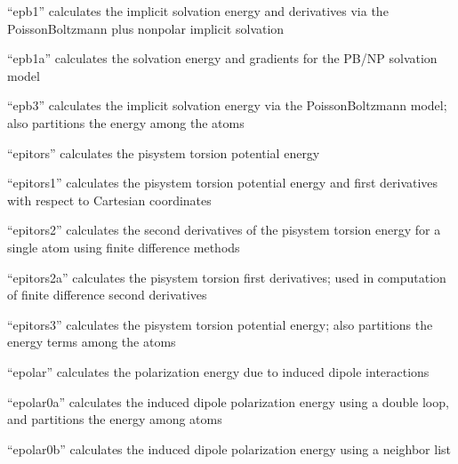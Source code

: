\documentclass[letterpaper,11pt,english]{sphinxmanual}
\begin{document}

“epb1” calculates the implicit solvation energy and derivatives
via the Poisson\sphinxhyphen{}Boltzmann plus nonpolar implicit solvation


“epb1a” calculates the solvation energy and gradients for the
PB/NP solvation model


“epb3” calculates the implicit solvation energy via the
Poisson\sphinxhyphen{}Boltzmann model; also partitions the energy among
the atoms


“epitors” calculates the pi\sphinxhyphen{}system torsion potential energy


“epitors1” calculates the pi\sphinxhyphen{}system torsion potential energy
and first derivatives with respect to Cartesian coordinates


“epitors2” calculates the second derivatives of the pi\sphinxhyphen{}system
torsion energy for a single atom using finite difference methods


“epitors2a” calculates the pi\sphinxhyphen{}system torsion first derivatives;
used in computation of finite difference second derivatives


“epitors3” calculates the pi\sphinxhyphen{}system torsion potential energy;
also partitions the energy terms among the atoms


“epolar” calculates the polarization energy due to induced
dipole interactions


“epolar0a” calculates the induced dipole polarization energy
using a double loop, and partitions the energy among atoms


“epolar0b” calculates the induced dipole polarization energy
using a neighbor list

\end{document}
